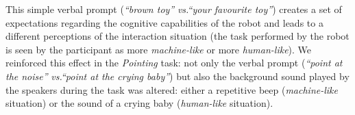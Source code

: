\documentclass[lettersize, noapacite, twoside, HRI]{apa_HRI}
\newcommand{\vs}{\textit{vs.}\xspace}
\begin{document}
This simple verbal prompt (\emph{``brown toy''} \vs \emph{``your favourite
toy''}) creates a set of expectations regarding the cognitive capabilities of
the robot and leads to a different perceptions of the interaction situation (the
task performed by the robot is seen by the participant as more
\emph{machine-like} or more \emph{human-like}). We reinforced this effect in the
\emph{Pointing} task: not only the verbal prompt (\emph{``point at the noise''}
\vs \emph{``point at the crying baby''}) but also the background sound played by
the speakers during the task was altered: either a repetitive beep
(\emph{machine-like} situation) or the sound of a crying baby (\emph{human-like}
situation).

\begin{figure}
    \centering


\end{figure}
\end{document}
